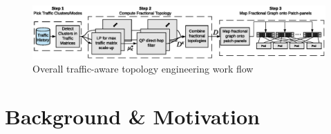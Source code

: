 \documentclass[sigconf]{acmart}
\theoremstyle{definition}
\begin{document}

\begin{figure}[ht!]
\centering
\includegraphics[trim={0.5cm 0.8cm 0.1cm 0.7cm}, width=\textwidth, scale=1.2]{figures/topology_engineering_overall_algorithm} 
\caption{Overall traffic-aware topology engineering work flow}
\label{topology_engineering_overall_workflow}
\end{figure}
\section{Background \& Motivation}\label{section_background}
\end{document}
